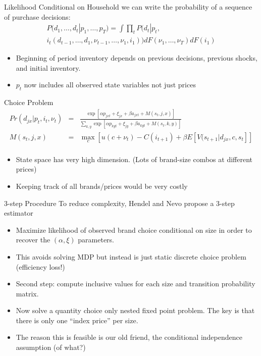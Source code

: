 \begin{frame}{Likelihood}
Conditional on Household we can write the probability of a sequence of purchase decisions:
\begin{eqnarray*}
P(d_1,\ldots,d_t | p_1,\ldots,p_T) = \int \prod_t P(d_t | p_t, \\
i_t(d_{t-1},\ldots,d_1, \nu_{t-1},\ldots,\nu_1,i_1))dF(\nu_1,\ldots,\nu_T) dF(i_1)
\end{eqnarray*}
\begin{itemize}
\item Beginning of period inventory depends on previous decisions, previous shocks, and initial inventory.
\item $p_t$ now includes all observed state variables not just prices
\end{itemize}
\end{frame}

\begin{frame}{Choice Problem}
\begin{eqnarray*}
Pr(d_{jx} | p_t,i_t,\nu_t) &=& \frac{\exp[\alpha p_{jxt} + \xi_{jx} + \beta a_{jxt} + M(s_t,j,x)]}{\sum_{k,y} \exp[\alpha p_{kyt} + \xi_{jy} + \beta a_{kyt} + M(s_t,k,y)]}\\
M (s_t,j,x) &=& \max_c [ u(c+\nu_t) - C(i_{t+1}) + \beta E[V(s_{t+1}|d_{jx},c,s_t]]\\
\end{eqnarray*}
\begin{itemize}
\item State space has very high dimension. (Lots of brand-size combos at different prices)
\item Keeping track of all brands/prices would be very costly
\end{itemize}
\end{frame}

\begin{frame}{3-step Procedure}
To reduce complexity, Hendel and Nevo propose a 3-step estimator
\begin{itemize}
\item Maximize likelihood of observed brand choice \alert{conditional} on size in order to recover the $(\alpha,\xi)$ parameters.
\item This avoids solving MDP but instead is just static discrete choice problem (efficiency loss!)
\item Second step: compute \alert{inclusive values} for each size and transition probability matrix.
\item Now solve a quantity choice only nested fixed point problem. The key is that there is \alert{only one ``index price'' per size}.
\item The reason this is feasible is our old friend, the \alert{conditional independence assumption} (of what?)
\end{itemize}
\end{frame}

